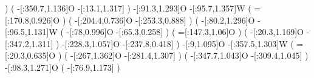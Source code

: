                               )
                              (
                -[:350.7,1.136]O%
                 -[:13.1,1.317]\phantom{W}%
                              )
             -[:91.3,1.293]O%
             -[:95.7,1.357]W%
                              (
                =[:170.8,0.926]O%
                              )
                              (
                -[:204.4,0.736]O%
                -[:253.3,0.888]\phantom{W}%
                              )
                              (
                 -[:80.2,1.296]O%
                 -[:96.5,1.131]W%
                                  (
                       -[:78,0.996]O%
                     -[:65.3,0.258]\phantom{W}%
                                  )
                                  (
                     =[:147.3,1.06]O%
                                  )
                                  (
                     -[:20.3,1.169]O%
                    -[:347.2,1.311]\phantom{W}%
                                  )
                -[:228.3,1.057]O%
                -[:237.8,0.418]\phantom{W}%
                              )
                -[:9,1.095]O%
            -[:357.5,1.303]W%
                              (
                 =[:20.3,0.635]O%
                              )
                              (
                  -[:267,1.362]O%
                -[:281.4,1.307]\phantom{W}%
                              )
                              (
                -[:347.7,1.043]O%
                -[:309.4,1.045]\phantom{W}%
                              )
             -[:98.3,1.271]O%
                              (
                 -[:76.9,1.173]\phantom{W}%
                              )